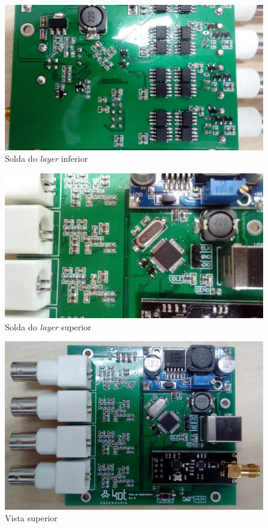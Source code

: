 \documentclass[
	12pt,				%
	openright,			%
	twoside,			%
	a4paper,			%
	english,			%
	french,				%
	spanish,			%
	brazil,				%
	]{abntex2}
\begin{document}
			\begin{figure}[!ht]
				\centering
				\includegraphics[width=\linewidth]{../Fotos/parteTras.jpg}
				\caption{Solda do \textit{layer} inferior}
			\end{figure}

			\begin{figure}[!ht]
				\centering
				\includegraphics[scale = 0.13]{../Fotos/parteCima.jpg}
				\caption{Solda do \textit{layer} superior}
			\end{figure}

			\begin{figure}[!ht]
				\centering
				\includegraphics[width=\linewidth]{../Fotos/vistaSuperior.jpg}
				\caption{Vista superior}
			\end{figure}
\end{document}
